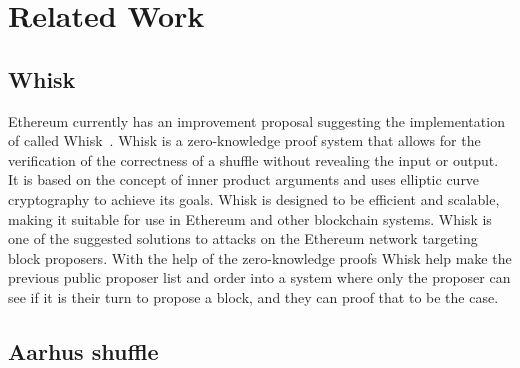 \section{Related Work}\label{sec:related-work}




\subsection{Whisk}\label{sec:related-work-whisk}
Ethereum currently has an improvement proposal suggesting the implementation of called Whisk~\cite{Whisk2024}.
Whisk is a zero-knowledge proof system that allows for the verification of the correctness of a shuffle without revealing the input or output.
It is based on the concept of inner product arguments and uses elliptic curve cryptography to achieve its goals.
Whisk is designed to be efficient and scalable, making it suitable for use in Ethereum and other blockchain systems.
Whisk is one of the suggested solutions to attacks on the Ethereum network targeting block proposers.
With the help of the zero-knowledge proofs Whisk help make the previous public proposer list and order into a system where only the proposer can see if it is their turn to propose a block, and they can proof that to be the case.


\subsection{Aarhus shuffle}\label{sec:related-work-aarhus-shuffle}
